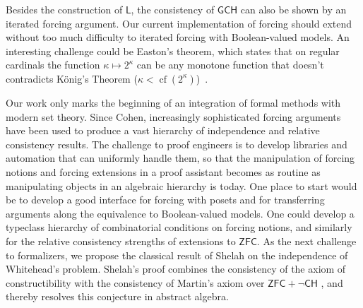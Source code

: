 \documentclass[sigplan,10pt,review, anonymous]{acmart}
\newcommand{\ZFC}{\mathsf{ZFC}}
\newcommand{\CH}{\mathsf{CH}}
\theoremstyle{definition}
\DeclareMathOperator{\cf}{cf}
\begin{document}


Besides the construction of \(\mathsf{L}\), the consistency of $\mathsf{GCH}$ can also be shown by an iterated forcing argument. Our current implementation of forcing should extend without too much difficulty to iterated forcing with Boolean-valued models.  %
An interesting challenge could be Easton's theorem, which states that on regular cardinals the function $\kappa\mapsto 2^\kappa$ can be any monotone function that doesn't contradicts K\"onig's Theorem ($\kappa<\cf(2^\kappa)$)~\cite{easton1970powers}.

Our work only marks the beginning of an integration of formal methods with modern set theory. Since Cohen, increasingly sophisticated forcing arguments have been used to produce a vast hierarchy of independence and relative consistency results. The challenge to proof engineers is to develop libraries and automation that can uniformly handle them, so that the manipulation of forcing notions and forcing extensions in a proof assistant becomes as routine as manipulating objects in an algebraic hierarchy is today. One place to start would be to develop a good interface for forcing with posets and for transferring arguments along the equivalence to Boolean-valued models. One could develop a typeclass hierarchy of combinatorial conditions on forcing notions, and similarly for the relative consistency strengths of extensions to \(\ZFC\).
As the next challenge to formalizers, we propose the classical result of Shelah \cite{shelah1974infinite} on the independence of Whitehead's problem.
Shelah's proof combines the consistency of the axiom of constructibility with the consistency of Martin's axiom over \(\ZFC + \neg \CH\) \cite{martin1970internal}, and thereby resolves this conjecture in abstract algebra.
\end{document}
